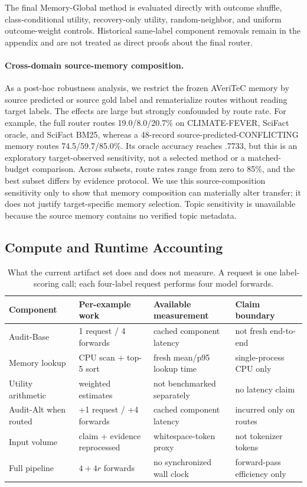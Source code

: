 \documentclass[runningheads]{llncs}
\begin{document}
The final Memory-Global method is evaluated directly with outcome shuffle,
class-conditional utility, recovery-only utility, random-neighbor, and uniform
outcome-weight controls. Historical same-label component removals remain in the
appendix and are not treated as direct proofs about the final router.

\paragraph{Cross-domain source-memory composition.}
As a post-hoc robustness analysis, we restrict the frozen AVeriTeC memory by
source predicted or source gold label and rematerialize routes without reading
target labels. The effects are large but strongly confounded by route rate.
For example, the full router routes 19.0/8.0/20.7\% on CLIMATE-FEVER, SciFact
oracle, and SciFact BM25, whereas a 48-record source-predicted-CONFLICTING
memory routes 74.5/59.7/85.0\%. Its oracle accuracy reaches .7733, but this is
an exploratory target-observed sensitivity, not a selected method or a
matched-budget comparison. Across subsets, route rates range from zero to
85\%, and the best subset differs by evidence protocol. We use this
source-composition sensitivity only to show that memory composition can
materially alter transfer; it does not justify target-specific memory
selection. Topic sensitivity is unavailable
because the source memory contains no verified topic metadata.

\subsection{Compute and Runtime Accounting}

\begin{table}[t]
\caption{What the current artifact set does and does not measure. A request is
one label-scoring call; each four-label request performs four model forwards.}
\label{tab:cost}
\centering\small
\begin{tabular}{llll}
\toprule
Component & Per-example work & Available measurement & Claim boundary \\
\midrule
Audit-Base & 1 request / 4 forwards & cached component latency & not fresh end-to-end \\
Memory lookup & CPU scan + top-5 sort & fresh mean/p95 lookup time & single-process CPU only \\
Utility arithmetic & weighted estimates & not benchmarked separately & no latency claim \\
Audit-Alt when routed & +1 request / +4 forwards & cached component latency & incurred only on routes \\
Input volume & claim + evidence reprocessed & whitespace-token proxy & not tokenizer tokens \\
Full pipeline & $4+4r$ forwards & no synchronized wall clock & forward-pass efficiency only \\
\bottomrule
\end{tabular}
\end{table}
\end{document}
